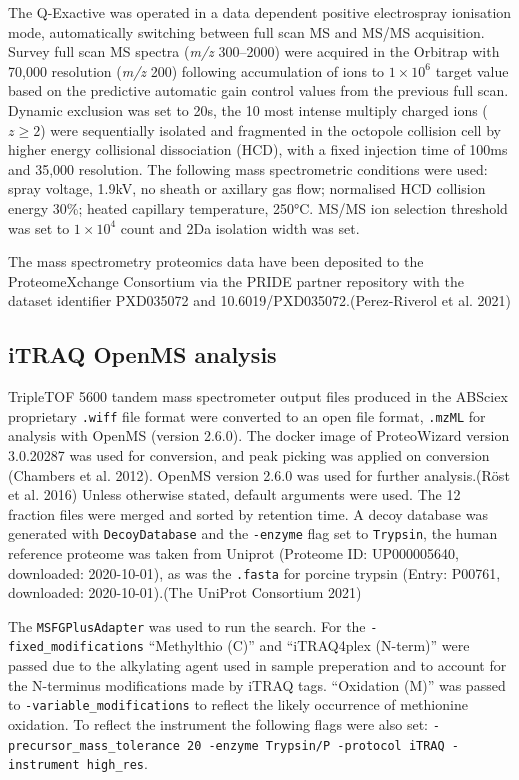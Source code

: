\documentclass[
]{article}
\begin{document}
The Q-Exactive was operated in a data dependent positive electrospray ionisation mode, automatically switching between full scan MS and MS/MS acquisition.
Survey full scan MS spectra (\emph{m/z} 300--2000) were acquired in the Orbitrap with 70,000 resolution (\emph{m/z} 200) following accumulation of ions to \(1\times 10^6\) target value based on the predictive automatic gain control values from the previous full scan.
Dynamic exclusion was set to 20s, the 10 most intense multiply charged ions (\(z \geq 2\)) were sequentially isolated and fragmented in the octopole collision cell by higher energy collisional dissociation (HCD), with a fixed injection time of 100ms and 35,000 resolution.
The following mass spectrometric conditions were used: spray voltage, 1.9kV, no sheath or axillary gas flow; normalised HCD collision energy 30\%; heated capillary temperature, 250°C.
MS/MS ion selection threshold was set to \(1\times 10^4\) count and 2Da isolation width was set.

The mass spectrometry proteomics data have been deposited to the ProteomeXchange Consortium via the PRIDE partner repository with the dataset identifier PXD035072 and 10.6019/PXD035072.(Perez-Riverol et al. 2021)

\hypertarget{openms-chap3}{%
\subsection{iTRAQ OpenMS analysis}\label{openms-chap3}}

TripleTOF 5600 tandem mass spectrometer output files produced in the ABSciex proprietary \texttt{.wiff} file format were converted to an open file format, \texttt{.mzML} for analysis with OpenMS (version 2.6.0).
The docker image of ProteoWizard version 3.0.20287 was used for conversion, and peak picking was applied on conversion (Chambers et al. 2012).
OpenMS version 2.6.0 was used for further analysis.(Röst et al. 2016) Unless otherwise stated, default arguments were used.
The 12 fraction files were merged and sorted by retention time.
A decoy database was generated with \texttt{DecoyDatabase} and the \texttt{-enzyme} flag set to \texttt{Trypsin}, the human reference proteome was taken from Uniprot (Proteome ID: UP000005640, downloaded: 2020-10-01), as was the \texttt{.fasta} for porcine trypsin (Entry: P00761, downloaded: 2020-10-01).(The UniProt Consortium 2021)

The \texttt{MSFGPlusAdapter} was used to run the search.
For the \texttt{-fixed\_modifications} ``Methylthio (C)'' and ``iTRAQ4plex (N-term)'' were passed due to the alkylating agent used in sample preperation and to account for the N-terminus modifications made by iTRAQ tags.
``Oxidation (M)'' was passed to \texttt{-variable\_modifications} to reflect the likely occurrence of methionine oxidation.
To reflect the instrument the following flags were also set: \texttt{-precursor\_mass\_tolerance\ 20\ -enzyme\ Trypsin/P\ -protocol\ iTRAQ\ -instrument\ high\_res}.
\end{document}
